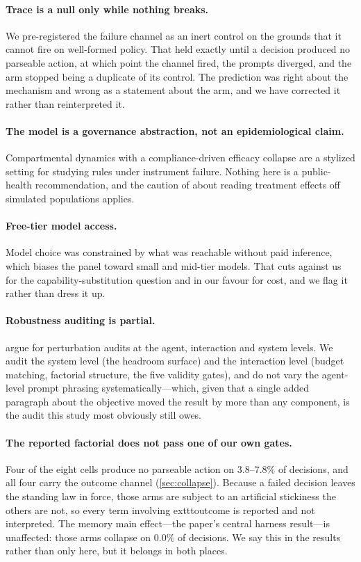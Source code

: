 \documentclass[11pt]{article}
\begin{document}
\paragraph{Trace is a null only while nothing breaks.} We pre-registered the failure channel as an
inert control on the grounds that it cannot fire on well-formed policy. That held exactly until a
decision produced no parseable action, at which point the channel fired, the prompts diverged, and
the arm stopped being a duplicate of its control. The prediction was right about the mechanism and
wrong as a statement about the arm, and we have corrected it rather than reinterpreted it.

\paragraph{The model is a governance abstraction, not an epidemiological claim.} Compartmental
dynamics with a compliance-driven efficacy collapse are a stylized setting for studying rules under
instrument failure. Nothing here is a public-health recommendation, and the caution of
\citet{li2026statistical} about reading treatment effects off simulated populations applies.

\paragraph{Free-tier model access.} Model choice was constrained by what was reachable without paid
inference, which biases the panel toward small and mid-tier models. That cuts against us for the
capability-substitution question and in our favour for cost, and we flag it rather than dress it up.

\paragraph{Robustness auditing is partial.} \citet{ye2026trails} argue for perturbation audits at the
agent, interaction and system levels. We audit the system level (the headroom surface) and the
interaction level (budget matching, factorial structure, the five validity gates), and do not vary
the agent-level prompt phrasing systematically---which, given that a single added paragraph about the objective
moved the result by more than any component, is the audit this study most obviously still owes.

\paragraph{The reported factorial does not pass one of our own gates.} Four of the eight cells
produce no parseable action on $3.8$--$7.8\%$ of decisions, and all four carry the outcome channel
(\cref{sec:collapse}). Because a failed decision leaves the standing law in force, those arms are
subject to an artificial stickiness the others are not, so every term involving 	exttt{outcome} is
reported and not interpreted. The memory main effect---the paper's central harness result---is
unaffected: those arms collapse on $0.0\%$ of decisions. We say this in the results rather than only
here, but it belongs in both places.
\end{document}
